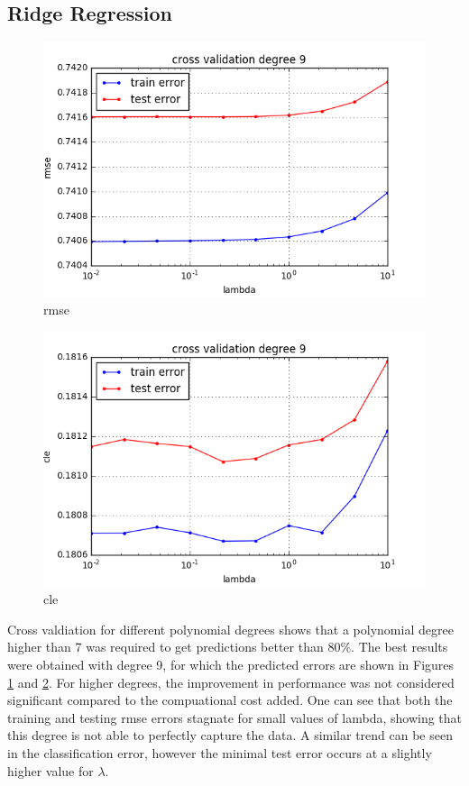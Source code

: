 \subsection{Ridge Regression}

\begin{figure}[htbp]
  \centering
  \includegraphics[width=.7\columnwidth]{figures/rmse_degree9final.png}
  \vspace{-3mm}
  \caption{rmse}
  \label{fig:rmse9}
\end{figure}

\begin{figure}[htbp]
  \centering
  \includegraphics[width=.7\columnwidth]{figures/cle_degree9final.png}
  \vspace{-3mm}
  \caption{cle}
  \label{fig:cle9}
\end{figure}

Cross valdiation for different polynomial degrees shows that a polynomial degree
higher than 7 was required to get predictions better than 80\%. 
The best results were obtained with degree 9, for which the predicted errors are
shown in Figures \ref{fig:rmse9} and \ref{fig:cle9}. For higher degrees, the
improvement in performance was not considered significant compared to the
compuational cost added. One can see that both the training and testing rmse
errors stagnate for small values of lambda, showing that this degree is not able to
perfectly capture the data. A similar trend can be seen in the classification
error, however the minimal test error occurs at a slightly higher value for
$\lambda$.  


